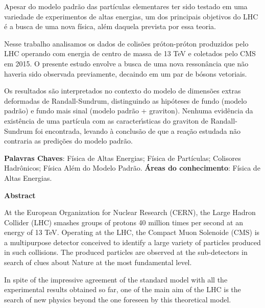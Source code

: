 Apesar do modelo padr\~ao das part\'iculas elementares ter sido testado em uma variedade de experimentos de altas energias, um dos principais objetivos do LHC \'e a busca de uma nova f\'isica, al\'em daquela prevista por essa teoria. 

Nesse trabalho analisamos os dados de colis\~oes pr\'oton-pr\'oton produzidos pelo LHC operando com energia de centro de massa de 13 TeV e coletados pelo CMS em 2015. O presente estudo envolve a busca de uma nova resson\^ancia que n\~ao haveria sido observada previamente, decaindo em um par de b\'osons vetoriais.

Os resultados s\~ao interpretados no contexto do modelo de dimens\~oes extras deformadas de Randall-Sundrum, distinguindo as hip\'oteses de fundo (modelo padr\~ao) e fundo mais sinal (modelo padr\~ao + graviton). Nenhuma evid\^encia da exist\^encia de uma part\'icula com as caracter\'{\i}sticas do graviton de Randall-Sundrum foi encontrada, levando \`a conclus\~ao de que a rea\c{c}\~ao estudada n\~ao contraria as predi\c c\~oes  do modelo padr\~ao.


\vskip 1.0cm
\noindent
{\bf Palavras Chaves}: F\'isica de Altas Energias; F\'isica de Part\'iculas; Colisores Hadr\^onicos; F\'isica Al\'em do Modelo Padr\~ao.
\vskip 0.5cm
\noindent
{\bf \'Areas do conhecimento}: F\'isica de Altas Energias.

\newpage

\begin{center}
{\LARGE \textsf{\textbf{Abstract}}}
\end{center}
\vskip 2.0cm


At the European Organization for Nuclear Research (CERN), the Large Hadron Collider (LHC) smashes groups of protons 40 million times per second at an energy of 13 TeV. Operating at the LHC, the Compact Muon Solenoide (CMS) is a multipurpose detector conceived to identify a large variety of particles produced in such collisions. The produced particles are observed at the sub-detectors in search of clues about Nature at the most fundamental level.

In spite of the impressive agreement of the standard model with all the experimental results obtained so far, one of the main aim of the LHC is the search of new physics beyond the one foreseen by this theoretical model.

